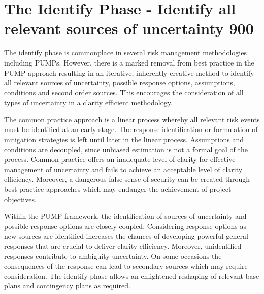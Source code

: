 
\section{The Identify Phase - Identify all relevant sources of uncertainty 900} \label{s:Identify}




The identify phase is commonplace in several risk management methodologies including PUMPs. 
However, there is a marked removal from best practice in the PUMP approach resulting in an iterative, inherently creative method to identify all relevant sources of uncertainty, possible response options, assumptions, conditions and second order sources.
This encourages the consideration of all types of uncertainty in a clarity efficient methodology.

The common practice approach is a linear process whereby all relevant risk events must be identified at an early stage. 
The response identification or formulation of mitigation strategies is left until later in the linear process. 
Assumptions and conditions are decoupled, since unbiased estimation is not a formal goal of the process. 
Common practice offers an inadequate level of clarity for effective management of uncertainty and fails to achieve an acceptable level of clarity efficiency.
Moreover, a dangerous false sense of security can be created through best practice approaches which may endanger the achievement of project objectives.
                         
Within the PUMP framework, the identification of sources of uncertainty and possible response options are closely coupled. 
Considering response options as new sources are identified increases the chances of developing powerful general responses that are crucial to deliver clarity efficiency. 
Moreover, unidentified responses contribute to ambiguity uncertainty. 
On some occasions the consequences of the response can lead to secondary sources which may require consideration.
The identify phase allows an enlightened reshaping of relevant base plans and contingency plans as required.


